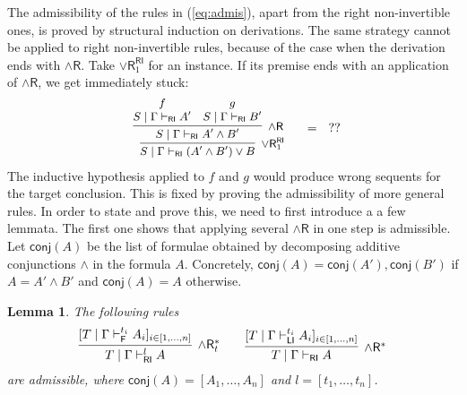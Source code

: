 \documentclass[submission,copyright,creativecommons]{eptcs}
\newtheorem{lemma}[theorem]{Lemma}
\theoremstyle{definition}
\newtheorem{defn}{Definition}[section]
\newcommand{\andr}{\land \mathsf{R}}
\newcommand{\orrone}{\lor \mathsf{R}_{1}}
\newcommand{\RI}{\mathsf{RI}}
\newcommand{\LI}{\mathsf{LI}}
\newcommand{\F}{\mathsf{F}}
\newcommand{\conj}[1]{\mathsf{conj} (#1)}
\newcommand{\proofbox}[1]{\begin{tabular}{l} #1 \end{tabular}}
\newcommand\niccolo[1]{\mbox{}
{\marginpar{\color{red}NV}}
{\sf\noindent\color{red}#1}}%
\begin{document}
The admissibility of the rules in (\ref{eq:admis}), apart from the right non-invertible ones, is proved by structural induction on derivations.
The same strategy cannot be applied to right non-invertible rules, because of the case when the derivation ends with $\andr$.
Take $\orrone^{\RI}$ for an instance. If its premise ends with an application of $\andr$, we get immediately stuck:
\begin{displaymath}
  \begin{array}{c}
    \small
    \proofbox{
    \infer[\orrone^{\RI}]{S \mid \Gamma \vdash_{\RI} (A' \land B') \lor B}{
      \infer[\andr]{S \mid \Gamma \vdash_{\RI} A' \land B'}{
        \deduce{S \mid \Gamma \vdash_{\RI} A'}{f}
        &
        \deduce{S \mid \Gamma \vdash_{\RI} B'}{g}
      }
    }
    }
    \quad
    =
    \quad
    ??
  \end{array}
\end{displaymath}
The inductive hypothesis applied to $f$ and $g$ would produce wrong sequents for the target conclusion.
This is fixed by proving the admissibility of more general rules. In order to state and prove this, we need to first introduce a a few lemmata. 
The first one shows that applying several $\andr$ in one step is admissible.
  Let $\conj{A}$ be the list of formulae obtained by decomposing additive conjunctions $\land$ in the formula $A$. Concretely, $\conj{A} = \conj{A'} , \conj{B'}$ if $A = A' \land B'$ and $\conj{A} = A$ otherwise.
\begin{lemma}\label{lem:BigStep}
  The following rules
  \begin{displaymath}
    \infer[\andr^{*}_t]{T \mid \Gamma \vdash^{l}_{\RI} A}{
      [T \mid \Gamma \vdash^{t_i}_{\F} A_i]_{i \in [1 , \dots , n]}
    }
    \qquad
    \infer[\andr^{*}]{T \mid \Gamma \vdash_{\RI} A}{
      [T \mid \Gamma \vdash^{t_i}_{\LI} A_i]_{i \in [1 , \dots , n]}
    }
  \end{displaymath}
  are admissible, where $\conj{A} = [A_1 , \dots , A_n]$ and $l = [t_1 , \dots , t_n]$.
\end{lemma}
\end{document}
